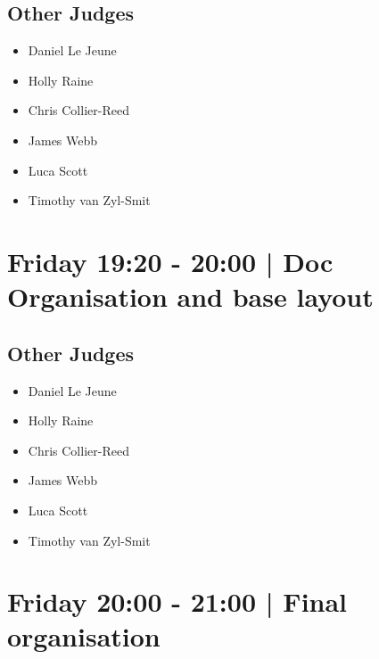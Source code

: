\documentclass[10pt, A5]{article}
\begin{document}
        \subsection*{Other Judges}
        
            \begin{itemize}
                            \item Daniel Le Jeune
                            \item Holly Raine
                            \item Chris Collier-Reed
                            \item James Webb
                            \item Luca Scott
                            \item Timothy van Zyl-Smit
                        \end{itemize}
        

            \section*{Friday 19:20
        -
        20:00
        |
         Doc Organisation and base layout}
        
                
        \subsection*{Other Judges}
        
            \begin{itemize}
                            \item Daniel Le Jeune
                            \item Holly Raine
                            \item Chris Collier-Reed
                            \item James Webb
                            \item Luca Scott
                            \item Timothy van Zyl-Smit
                        \end{itemize}
        

            \section*{Friday 20:00
        -
        21:00
        |
         Final organisation}
        
                
\end{document}
